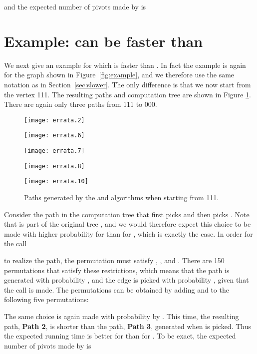 \documentclass[twoside,11pt]{article}
\begin{document}
and
the expected number of pivots made by  is



\section{Example:  can be faster than }\label{sec:faster}

We next give an example for which  is faster than . In fact the example is again for the graph shown in Figure~\ref{fig:example}, and we therefore use the same notation as in Section~\ref{sec:slower}. The only difference is that we now start from the vertex 111. The resulting paths and computation tree are shown in Figure \ref{fig:faster}. There are again only three paths from 111 to 000.

\begin{figure}[t]
\begin{center}
\parbox{1.2in}{
\center
\texttt{[image: errata.2]}
}
\hspace*{5pt}
\parbox{1.5in}{
\center
\texttt{[image: errata.6]}
}
\hspace*{5pt}
\parbox{1.5in}{
\center
\texttt{[image: errata.7]}
}
\hspace*{5pt}
\parbox{1.5in}{
\center
\texttt{[image: errata.8]}
}

\vspace*{5pt}

\parbox{6in}{
\center
\texttt{[image: errata.10]}
\caption{Paths generated by the  and  algorithms when starting from 111.}\label{fig:faster}
}
\end{center}
\end{figure}

Consider the path in the computation tree that first picks  and then picks . Note that  is part of the original tree , and we would therefore expect this choice to be made with higher probability for  than for , which is exactly the case.
In order for the call

to realize the path, the permutation  must satisfy , , and . There are 150 permutations that satisfy these restrictions, which means that the path is generated with probability , and the edge is picked with probability , given that the call is made. The permutations can be obtained by adding  and  to the following five permutations:

The same choice is again made with probability  by . This time, the resulting path, \textbf{Path 2}, is shorter than the path, \textbf{Path 3}, generated when  is picked. Thus the expected running time is better for  than for . To be exact, the expected number of pivots made by  is
\end{document}

